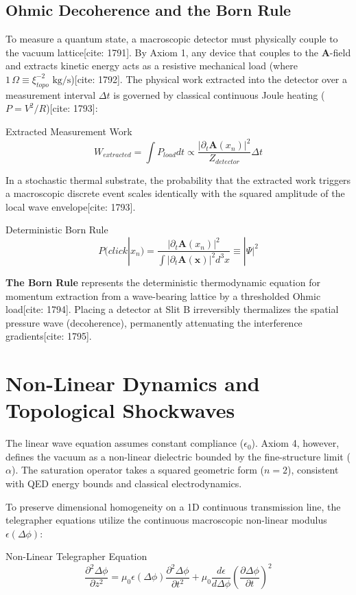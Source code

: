 \subsection{Ohmic Decoherence and the Born Rule}
To measure a quantum state, a macroscopic detector must physically couple to the vacuum lattice[cite: 1791]. By Axiom 1, any device that couples to the $\mathbf{A}$-field and extracts kinetic energy acts as a resistive mechanical load (where $1 \, \Omega \equiv \xi_{topo}^{-2} \text{ kg/s}$)[cite: 1792]. The physical work extracted into the detector over a measurement interval $\Delta t$ is governed by classical continuous Joule heating ($P = V^2 / R$)[cite: 1793]:
\begin{resultbox}{Extracted Measurement Work}
\begin{equation}
    W_{extracted} = \int P_{load} dt \propto \frac{|\partial_t \mathbf{A}(x_n)|^2}{Z_{detector}} \Delta t
\end{equation}
\end{resultbox}

In a stochastic thermal substrate, the probability that the extracted work triggers a macroscopic discrete event scales identically with the squared amplitude of the local wave envelope[cite: 1793].
\begin{resultbox}{Deterministic Born Rule}
\begin{equation}
    P(click | x_n) = \frac{|\partial_t \mathbf{A}(x_n)|^2}{\int |\partial_t \mathbf{A}(\mathbf{x})|^2 d^3x} \equiv |\Psi|^2
\end{equation}
\end{resultbox}
\textbf{The Born Rule} represents the deterministic thermodynamic equation for momentum extraction from a wave-bearing lattice by a thresholded Ohmic load[cite: 1794]. Placing a detector at Slit B irreversibly thermalizes the spatial pressure wave (decoherence), permanently attenuating the interference gradients[cite: 1795].

\section{Non-Linear Dynamics and Topological Shockwaves}
The linear wave equation assumes constant compliance ($\epsilon_0$). Axiom 4, however, defines the vacuum as a non-linear dielectric bounded by the fine-structure limit ($\alpha$). The saturation operator takes a squared geometric form ($n=2$), consistent with QED energy bounds and classical electrodynamics.

To preserve dimensional homogeneity on a 1D continuous transmission line, the telegrapher equations utilize the continuous macroscopic non-linear modulus $\epsilon(\Delta\phi)$:
\begin{resultbox}{Non-Linear Telegrapher Equation}
\begin{equation}
\label{eq:nonlinear_wave}
    \frac{\partial^{2}\Delta\phi}{\partial z^{2}} = \mu_0 \epsilon(\Delta\phi)\frac{\partial^{2}\Delta\phi}{\partial t^{2}} + \mu_0 \frac{d\epsilon}{d\Delta\phi}\left(\frac{\partial \Delta\phi}{\partial t}\right)^{2}
\end{equation}
\end{resultbox}

